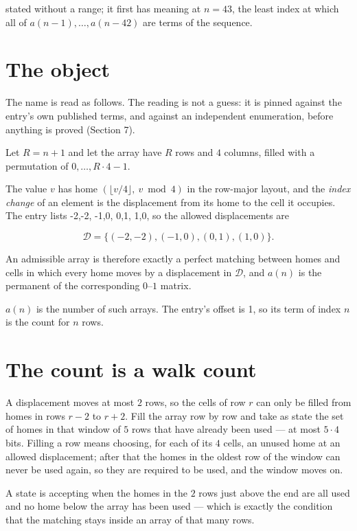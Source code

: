 \documentclass[11pt]{article}
\theoremstyle{definition}
\begin{document}
stated without a range; it first has meaning at $n = 43$, the least index at which all of $a(n-1),\dots,a(n-42)$ are terms of the sequence.

\section{The object}

The name is read as follows. The reading is not a guess: it is pinned against the entry's own published terms, and against an independent enumeration, before anything is proved (Section 7).

Let $R = n + 1$ and let the array have $R$ rows and $4$ columns, filled with a permutation of $0,\dots,R\cdot4-1$.

The value $v$ has home $(\lfloor v/4\rfloor,\ v \bmod 4)$ in the row-major layout, and the {\itshape index change} of an element is the displacement from its home to the cell it occupies. The entry lists -2,-2, -1,0, 0,1, 1,0, so the allowed displacements are

\[\mathcal{D} = \{(-2,-2), (-1,0), (0,1), (1,0)\}.\]

An admissible array is therefore exactly a perfect matching between homes and cells in which every home moves by a displacement in $\mathcal{D}$, and $a(n)$ is the permanent of the corresponding $0$--$1$ matrix.

$a(n)$ is the number of such arrays. The entry's offset is 1, so its term of index $n$ is the count for $n$ rows.

\section{The count is a walk count}

A displacement moves at most $2$ rows, so the cells of row $r$ can only be filled from homes in rows $r-2$ to $r+2$. Fill the array row by row and take as state the set of homes in that window of $5$ rows that have already been used --- at most $5\cdot4$ bits. Filling a row means choosing, for each of its $4$ cells, an unused home at an allowed displacement; after that the homes in the oldest row of the window can never be used again, so they are required to be used, and the window moves on.

A state is accepting when the homes in the $2$ rows just above the end are all used and no home below the array has been used --- which is exactly the condition that the matching stays inside an array of that many rows.
\end{document}
